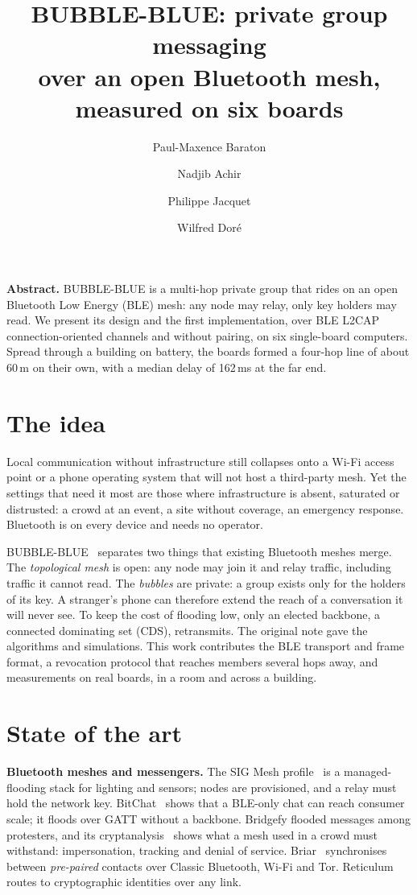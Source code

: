 \documentclass[10pt,twocolumn,letterpaper]{article}
\title{\vspace{-6mm}\sffamily\bfseries\LARGE BUBBLE-BLUE: private group messaging\\
over an open Bluetooth mesh, measured on six boards}
\author[1]{Paul-Maxence Baraton}
\author[1]{Nadjib Achir}
\author[1]{Philippe Jacquet}
\author[2]{Wilfred Doré}
\affil[1]{Inria, France; \texttt{\{paul-maxence.baraton, nadjib.achir, philippe.jacquet\}@inria.fr}}
\affil[2]{Qualcomm, France; \texttt{wdore@qti.qualcomm.com}}
\date{\vspace{-8mm}}
\newcommand{\sub}[1]{\smallskip\noindent\textsf{\textbf{#1}}\enspace}
\begin{document}
\maketitle
\thispagestyle{empty}

\noindent\textsf{\textbf{Abstract.}} \textsf{BUBBLE-BLUE is a multi-hop
private group that rides on an open Bluetooth Low Energy (BLE) mesh: any
node may relay, only key holders may read. We present its design and the
first implementation, over BLE L2CAP connection-oriented channels and
without pairing, on six single-board computers. Spread through a building
on battery, the boards formed a four-hop line of about 60\,m on their
own, with a median delay of 162\,ms at the far end.}

\section{The idea}

Local communication without infrastructure still collapses onto a Wi-Fi
access point or a phone operating system that will not host a
third-party mesh. Yet the settings that need it most are those where
infrastructure is absent, saturated or distrusted: a crowd at an event, a
site without coverage, an emergency response. Bluetooth is on every
device and needs no operator.

BUBBLE-BLUE~\cite{achir2025bb} separates two things that existing
Bluetooth meshes merge. The \emph{topological mesh} is open: any node may
join it and relay traffic, including traffic it cannot read. The
\emph{bubbles} are private: a group exists only for the holders of its
key. A stranger's phone can therefore extend the reach of a conversation
it will never see. To keep the cost of flooding low, only an elected
backbone, a connected dominating set (CDS), retransmits. The original
note gave the algorithms and simulations. This work contributes the BLE
transport and frame format, a revocation protocol that reaches members
several hops away, and measurements on real boards, in a room and across
a building.

\section{State of the art}

\sub{Bluetooth meshes and messengers.} The SIG Mesh
profile~\cite{mesh-profile} is a managed-flooding stack for lighting and
sensors; nodes are provisioned, and a relay must hold the network key.
BitChat~\cite{bitchat} shows that a BLE-only chat can reach consumer
scale; it floods over GATT without a backbone. Bridgefy
flooded messages among protesters, and its cryptanalysis~\cite{albrecht2021}
shows what a mesh used in a crowd must withstand: impersonation, tracking
and denial of service.
Briar~\cite{briar} synchronises between \emph{pre-paired} contacts over
Classic Bluetooth, Wi-Fi and Tor. Reticulum~\cite{reticulum} routes to
cryptographic identities over any link.
\end{document}
